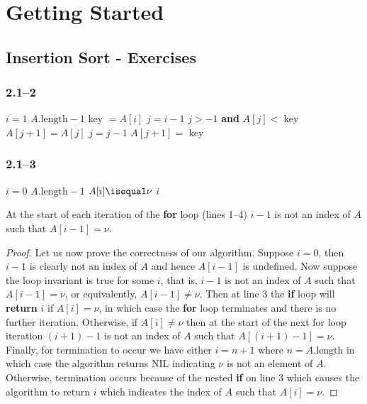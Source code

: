 \section{Getting Started}
\label{sec:chapter2}

\subsection{Insertion Sort - Exercises}

\subsubsection*{2.1--2}

\begin{codebox}
	\li \For $i = 1$ \To $A.\text{length}-1$
	\li	\Do
				key $= A[i]$
	\li 	$j = i - 1$
	\li		\While $j > -1$ \textbf{and} $A[j] <$ key
	\li		\Do
					$A[j+1] = A[j]$
	\li			$j = j - 1$
				\End
	\li		$A[j+1] =$ key
			\End
\end{codebox}

\subsubsection*{2.1--3}

\begin{codebox}
	\li \For $i = 0$ \To $A.\text{length}-1$
	\li \Do
				\If $A[i] \isequal \nu$
	\li		\Then
					\Return $i$
				\End
			\End
	\li		\Return {}
\end{codebox}

\begin{invariant}
	At the start of each iteration of the \textbf{for} loop (lines 1--4) $i-1$ is not an index of $A$ such that $A[i-1]=\nu$.
\end{invariant}

\begin{proof}
	Let us now prove the correctness of our algorithm. Suppose $i=0$, then $i-1$ is clearly not an index of $A$ and hence $A[i-1]$ is undefined. Now suppose the loop invariant is true for some $i$, that is, $i-1$ is not an index of $A$ such that $A[i-1]=\nu$, or equivalently, $A[i-1]\neq\nu$. Then at line 3 the \textbf{if} loop will \textbf{return} $i$ if $A[i]=\nu$, in which case the \textbf{for} loop terminates and there is no further iteration. Otherwise, if $A[i]\neq\nu$ then at the start of the next for loop iteration $(i+1)-1$ is not an index of $A$ such that $A[(i+1)-1]=\nu$. Finally, for termination to occur we have either $i=n+1$ where $n=A.\text{length}$ in which case the algorithm returns NIL indicating $\nu$ is not an element of $A$. Otherwise, termination occurs because of the nested \textbf{if} on line 3 which causes the algorithm to return $i$ which indicates the index of $A$ such that $A[i]=\nu$.
\end{proof}

